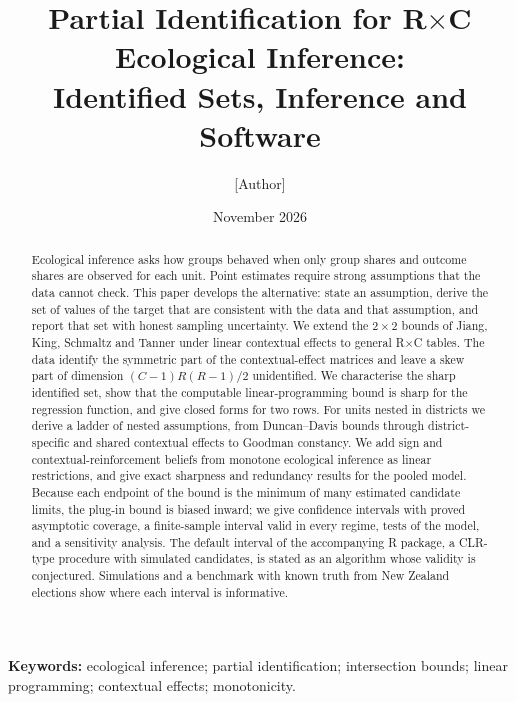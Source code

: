 \documentclass[11pt]{article}
\title{Partial Identification for R$\times$C Ecological Inference:\\
Identified Sets, Inference and Software}
\author{[Author]}
\date{November 2026}
\begin{document}
\maketitle

\begin{abstract}
\noindent Ecological inference asks how groups behaved when only group shares
and outcome shares are observed for each unit. Point estimates require strong
assumptions that the data cannot check. This paper develops the alternative:
state an assumption, derive the set of values of the target that are consistent
with the data and that assumption, and report that set with honest sampling
uncertainty. We extend the $2\times2$ bounds of Jiang, King, Schmaltz and Tanner
under linear contextual effects to general R$\times$C tables. The data identify
the symmetric part of the contextual-effect matrices and leave a skew part of
dimension $(C-1)R(R-1)/2$ unidentified. We characterise the sharp identified
set, show that the computable linear-programming bound is sharp for the
regression function, and give closed forms for two rows. For units nested in
districts we derive a ladder of nested assumptions, from Duncan--Davis bounds
through district-specific and shared contextual effects to Goodman constancy.
We add sign and contextual-reinforcement beliefs from monotone ecological
inference as linear restrictions, and give exact sharpness and redundancy
results for the pooled model. Because each endpoint of the bound is the minimum
of many estimated candidate limits, the plug-in bound is biased inward; we give
confidence intervals with proved asymptotic coverage, a finite-sample interval
valid in every regime, tests of the model, and a sensitivity analysis. The
default interval of the accompanying R package, a CLR-type procedure with
simulated candidates, is stated as an algorithm whose validity is conjectured.
Simulations and a benchmark with known truth from New Zealand elections show
where each interval is informative.
\end{abstract}

\noindent\textbf{Keywords:} ecological inference; partial identification;
intersection bounds; linear programming; contextual effects; monotonicity.

\tableofcontents
\clearpage













\end{document}

